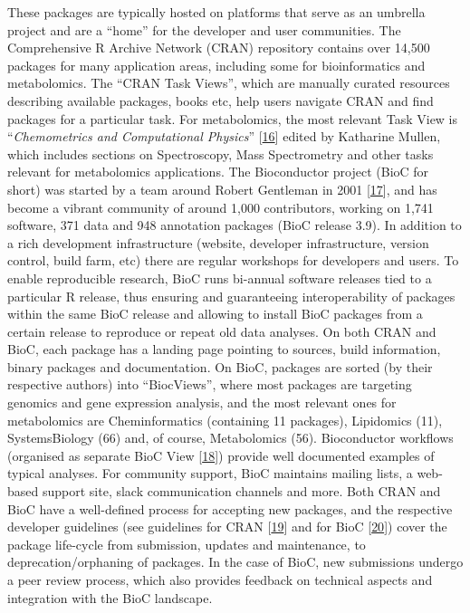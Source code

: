 \documentclass[]{article}
\begin{document}
These packages are typically hosted on platforms that serve as an umbrella project and are a ``home'' for the developer and user communities. The Comprehensive R Archive Network (CRAN) repository contains over 14,500 packages for many application areas, including some for bioinformatics and metabolomics. The ``CRAN Task Views'', which are manually curated resources describing available packages, books etc, help users navigate CRAN and find packages for a particular task. For metabolomics, the most relevant Task View is ``\emph{Chemometrics and Computational Physics}'' {[}\protect\hyperlink{ref-mullen_website_2019}{16}{]} edited by Katharine Mullen, which includes sections on Spectroscopy, Mass Spectrometry and other tasks relevant for metabolomics applications. The Bioconductor project (BioC for short) was started by a team around Robert Gentleman in 2001 {[}\protect\hyperlink{ref-gentleman_2004}{17}{]}, and has become a vibrant community of around 1,000 contributors, working on 1,741 software, 371 data and 948 annotation packages (BioC release 3.9). In addition to a rich development infrastructure (website, developer infrastructure, version control, build farm, etc) there are regular workshops for developers and users. To enable reproducible research, BioC runs bi-annual software releases tied to a particular R release, thus ensuring and guaranteeing interoperability of packages within the same BioC release and allowing to install BioC packages from a certain release to reproduce or repeat old data analyses. On both CRAN and BioC, each package has a landing page pointing to sources, build information, binary packages and documentation. On BioC, packages are sorted (by their respective authors) into ``BiocViews'', where most packages are targeting genomics and gene expression analysis, and the most relevant ones for metabolomics are Cheminformatics (containing 11 packages), Lipidomics (11), SystemsBiology (66) and, of course, Metabolomics (56). Bioconductor workflows (organised as separate BioC View {[}\protect\hyperlink{ref-bioconductor_website_nda}{18}{]}) provide well documented examples of typical analyses. For community support, BioC maintains mailing lists, a web-based support site, slack communication channels and more. Both CRAN and BioC have a well-defined process for accepting new packages, and the respective developer guidelines (see guidelines for CRAN {[}\protect\hyperlink{ref-thecomprehensiverarchivenetwork_website_nd}{19}{]} and for BioC {[}\protect\hyperlink{ref-bioconductor_website_nd}{20}{]}) cover the package life-cycle from submission, updates and maintenance, to deprecation/orphaning of packages. In the case of BioC, new submissions undergo a peer review process, which also provides feedback on technical aspects and integration with the BioC landscape.
\end{document}
